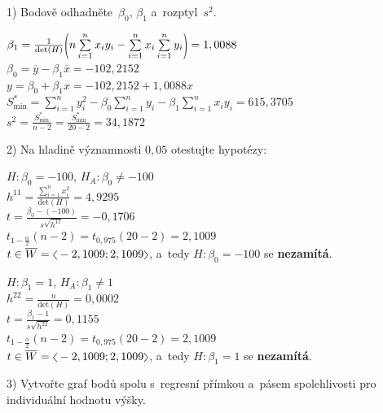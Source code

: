 \documentclass[a4paper, 11pt]{article}
\newcommand{\intlr}[1]{\scaleleftright[1ex]{<}{#1}{>}}
\newcommand{\intopen}[1]{\scaleleftright[1ex]{(}{#1}{)}}
\begin{document}
	\vspace{1em}
	1) Bodově odhadněte~$ \beta_0 $, $ \beta_1 $ a~rozptyl~$ s^2 $.
	\vspace{1em}

	$ \beta_1 = \frac{1}{\mathrm{det}(H)} \intopen{n \sum\limits_{i = 1}^n
	x_i y_i - \sum\limits_{i = 1}^n x_i \sum\limits_{i = 1}^n y_i} =
	1,0088 $ \\
	$ \beta_0 = \overline{y} - \beta_1 \overline{x} = -102,2152 $ \\
	$ y = \beta_0 + \beta_1 x = -102,2152 + 1,0088 x $ \\
	$ S_{\mathrm{min}}^* = \sum\limits_{i = 1}^n y_i^2 - \beta_0
	\sum\limits_{i = 1}^n y_i - \beta_1 \sum\limits_{i = 1}^n x_i y_i =
	615,3705 $ \\
	$ s^2 = \frac{S_{\mathrm{min}}^*}{n - 2} = \frac{S_{\mathrm{min}}^*}{20
	- 2} = 34,1872 $

	\vspace{1em}
	2) Na hladině významnosti $ 0, 05 $ otestujte hypotézy:
	\vspace{1em}

	$ H : \beta_0 = -100 $, $ H_A : \beta_0 \neq -100 $ \\
	$ h^{11} = \frac{\sum\limits_{i = 1}^n x_i^2}{\mathrm{det}(H)} =
	4,9295 $ \\
	$ t = \frac{\beta_0 - (-100)}{s \sqrt{h^{11}}} = -0,1706 $ \\
	$ t_{1 - \frac{\alpha}{2}}(n - 2) = t_{0,975}(20 - 2) = 2,1009 $ \\
	$ t \in \overline{W} = \intlr{-2,1009; 2,1009} $, a~tedy $ H :
	\beta_0 = -100 $ se \textbf{nezamítá}.

	\vspace{1em}

	$ H : \beta_1 = 1 $, $ H_A : \beta_1 \neq 1 $ \\
	$ h^{22} = \frac{n}{\mathrm{det}(H)} = 0,0002 $ \\
	$ t = \frac{\beta_1 - 1}{s \sqrt{h^{22}}} = 0,1155 $ \\
	$ t_{1 - \frac{\alpha}{2}}(n - 2) = t_{0,975}(20 - 2) = 2,1009 $ \\
	$ t \in \overline{W} = \intlr{-2,1009; 2,1009} $, a~tedy $ H :
	\beta_1 = 1 $ se \textbf{nezamítá}.

	\newpage
	\vspace{1em}
	3) Vytvořte graf bodů spolu s~regresní přímkou a~pásem spolehlivosti
	pro individuální hodnotu výšky.
	\vspace{1em}
\end{document}
